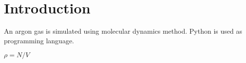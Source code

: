 \section{Introduction}
An argon gas is simulated using molecular dynamics method. Python is used as programming language.

$\rho=N/V$